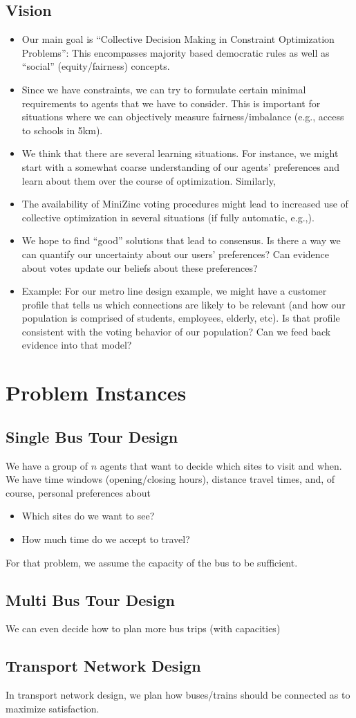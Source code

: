 \documentclass[10pt,a4paper,fleqn]{article}
\begin{document}
\subsection{Vision}

\begin{itemize}
\item Our main goal is ``Collective Decision Making in Constraint Optimization Problems'': This encompasses majority based 
democratic rules as well as ``social'' (equity/fairness) concepts.
\item Since we have constraints, we can try to formulate certain minimal requirements to agents that we have to consider. 
This is important for situations where we can objectively measure fairness/imbalance (e.g.,  access to schools in 5km).
\item We think that there are several learning situations. For instance, we might start with a somewhat coarse understanding 
of our agents' preferences and learn about them over the course of optimization. Similarly, 
\item The availability of MiniZinc voting procedures might lead to increased use of collective optimization in several situations (if fully automatic, e.g.,).
\item We hope to find ``good'' solutions that lead to consensus. Is there a way we can quantify our uncertainty about our users' preferences? Can evidence about votes update our beliefs about these preferences?
\item Example: For our metro line design example, we might have a customer profile that tells us which connections are likely to be relevant (and how our population is comprised of students, employees, elderly, etc). Is that profile consistent with the voting behavior of our population? Can we feed back evidence into that model?

\end{itemize}

\section{Problem Instances}

\subsection{Single Bus Tour Design}
We have a group of $n$ agents that want to decide which sites to visit and when. We have time windows (opening/closing hours), distance travel times, and, of course, personal preferences about
\begin{itemize}
\item Which sites do we want to see? 
\item How much time do we accept to travel?
\end{itemize}
For that problem, we assume the capacity of the bus to be sufficient.

\subsection{Multi Bus Tour Design}
We can even decide how to plan more bus trips (with capacities)
\subsection{Transport Network Design}
In transport network design, we plan how buses/trains should be connected as to maximize satisfaction.
\end{document}
